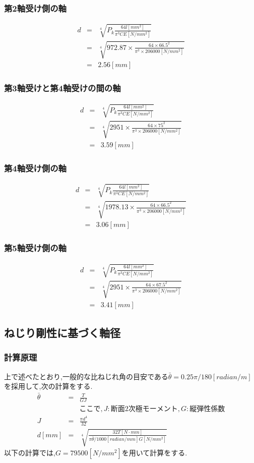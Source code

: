 \documentclass[a4j,twoside,openright,11pt]{jreport}
\begin{document}
\subsubsection{第2軸受け側の軸}
\begin{eqnarray}
d&=&\sqrt[4]{P_k\frac{64l[mm^2]}{\pi^3CE[N/mm^2]}}\\
 &=&\sqrt[4]{972.87 \times \frac{64\times 66.5^2}{\pi^3 \times 206000[N/mm^2]}}\\
 &=&2.56[mm]
\end{eqnarray}
\subsubsection{第3軸受けと第4軸受けの間の軸}
\begin{eqnarray}
d&=&\sqrt[4]{P_k\frac{64l[mm^2]}{\pi^3CE[N/mm^2]}}\\
 &=&\sqrt[4]{2951 \times \frac{64\times 75^2}{\pi^3 \times 206000[N/mm^2]}}\\
 &=&3.59[mm]
\end{eqnarray}
\subsubsection{第4軸受け側の軸}
\begin{eqnarray}
d&=&\sqrt[4]{P_k\frac{64l[mm^2]}{\pi^3CE[N/mm^2]}}\\
 &=&\sqrt[4]{1978.13 \times \frac{64\times 66.5^2}{\pi^3 \times 206000[N/mm^2]}}\\
 &=&3.06[mm]
\end{eqnarray}
\subsubsection{第5軸受け側の軸}
\begin{eqnarray}
d&=&\sqrt[4]{P_k\frac{64l[mm^2]}{\pi^3CE[N/mm^2]}}\\
 &=&\sqrt[4]{2951 \times \frac{64\times 67.5^2}{\pi^3 \times 206000[N/mm^2]}}\\
 &=&3.41[mm]
\end{eqnarray}
\subsection{ねじり剛性に基づく軸径}
\subsubsection{計算原理}
上で述べたとおり,一般的な比ねじれ角の目安である$\bar{\theta} = 0.25\pi /180 [radian/m]$を採用して,次の計算をする.
\begin{eqnarray}
\bar{\theta} &=& \frac{T}{GJ}\\
&&ここで,J:断面2次極モーメント,G:縦弾性係数\\
J&=&\frac{\pi d^4}{32}\\
d[mm]&=&\sqrt[4]{\frac{32T[N \cdot mm]}{\pi \bar{\theta}/1000[radian/mm] G[N/mm^2]}}
\end{eqnarray}
以下の計算では,$G=79500[N/mm^2]$を用いて計算をする.
\end{document}
